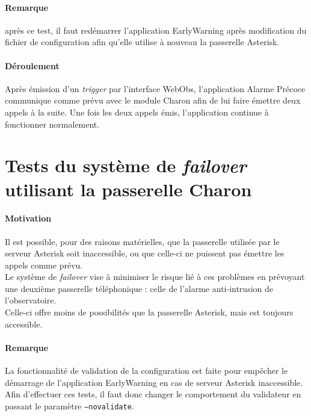 \documentclass{article}
\begin{document}
\paragraph{Remarque} après ce test, il faut redémarrer l'application EarlyWarning après modification du fichier de configuration afin qu'elle utilise à nouveau la passerelle Asterisk.

\paragraph{Déroulement\\}

Après émission d'un \emph{trigger} par l'interface WebObs, l'application Alarme Précoce communique comme prévu avec le module Charon afin de lui faire émettre deux appels à la suite. Une fois les deux appels émis, l'application continue à fonctionner normalement.

\pagebreak
\section{Tests du système de \textit{failover} utilisant la passerelle Charon} 

\paragraph{Motivation\\}

Il est possible, pour des raisons matérielles, que la passerelle utilisée par le serveur Asterisk soit inaccessible, ou que celle-ci ne puissent pas émettre les appels comme prévu. \\
Le système de \emph{failover} vise à minimiser le risque lié à ces problèmes en prévoyant une deuxième passerelle téléphonique : celle de l'alarme anti-intrusion de l'observatoire. \\
Celle-ci offre moins de possibilités que la passerelle Asterisk, mais est toujours accessible.

\paragraph{Remarque} La fonctionnalité de validation de la configuration est faite pour empêcher le démarrage de l'application EarlyWarning en cas de serveur Asterisk inaccessible. Afin d'effectuer ces tests, il faut donc changer le comportement du validateur en passant le paramètre \texttt{--novalidate}.\\
\end{document}
